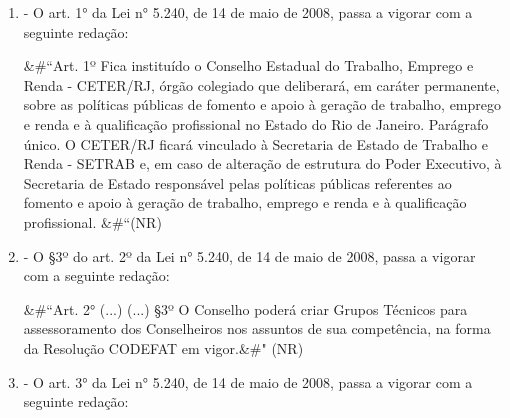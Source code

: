\documentclass[10pt]{article}
\begin{document}
\begin{enumerate}[label=Art. \arabic*\textdegree]
\item - O art. 1° da Lei n° 5.240, de 14 de maio de 2008, passa a vigorar com a seguinte redação:

&#``Art. 1º Fica instituído o Conselho Estadual do Trabalho, Emprego e Renda - CETER/RJ, órgão colegiado que deliberará, em caráter permanente, sobre as políticas públicas de fomento e apoio à geração de trabalho, emprego e renda e à qualificação profissional no Estado do Rio de Janeiro.
Parágrafo único. O CETER/RJ ficará vinculado à Secretaria de Estado de Trabalho e Renda - SETRAB e, em caso de alteração de estrutura do Poder Executivo, à Secretaria de Estado responsável pelas políticas públicas referentes ao fomento e apoio à geração de trabalho, emprego e renda e à qualificação profissional. &#``(NR)

\item - O §3º do art. 2º da Lei n° 5.240, de 14 de maio de 2008, passa a vigorar com a seguinte redação:

&#``Art. 2° (...)
(...)
§3º O Conselho poderá criar Grupos Técnicos para assessoramento dos Conselheiros nos assuntos de sua competência, na forma da Resolução CODEFAT em vigor.&#" (NR)

\item - O art. 3° da Lei n° 5.240, de 14 de maio de 2008, passa a vigorar com a seguinte redação:


\end{enumerate}
\end{document}
